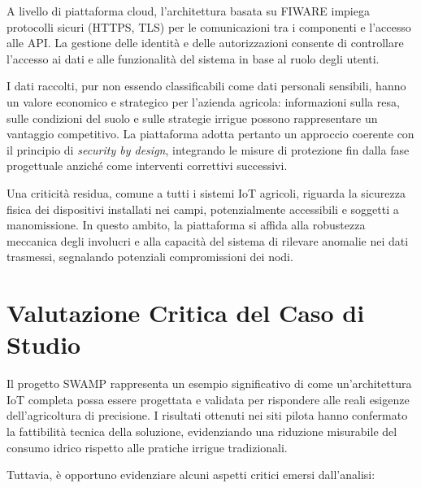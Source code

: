 A livello di piattaforma cloud, l'architettura basata su FIWARE impiega protocolli sicuri (HTTPS, TLS) per le comunicazioni tra i componenti e l'accesso alle API. La gestione delle identità e delle autorizzazioni consente di controllare l'accesso ai dati e alle funzionalità del sistema in base al ruolo degli utenti.

I dati raccolti, pur non essendo classificabili come dati personali sensibili, hanno un valore economico e strategico per l'azienda agricola: informazioni sulla resa, sulle condizioni del suolo e sulle strategie irrigue possono rappresentare un vantaggio competitivo. La piattaforma adotta pertanto un approccio coerente con il principio di \textit{security by design}, integrando le misure di protezione fin dalla fase progettuale anziché come interventi correttivi successivi.

Una criticità residua, comune a tutti i sistemi IoT agricoli, riguarda la sicurezza fisica dei dispositivi installati nei campi, potenzialmente accessibili e soggetti a manomissione. In questo ambito, la piattaforma si affida alla robustezza meccanica degli involucri e alla capacità del sistema di rilevare anomalie nei dati trasmessi, segnalando potenziali compromissioni dei nodi.


\section{Valutazione Critica del Caso di Studio}

Il progetto SWAMP rappresenta un esempio significativo di come un'architettura IoT completa possa essere progettata e validata per rispondere alle reali esigenze dell'agricoltura di precisione. I risultati ottenuti nei siti pilota hanno confermato la fattibilità tecnica della soluzione, evidenziando una riduzione misurabile del consumo idrico rispetto alle pratiche irrigue tradizionali.

Tuttavia, è opportuno evidenziare alcuni aspetti critici emersi dall'analisi:

